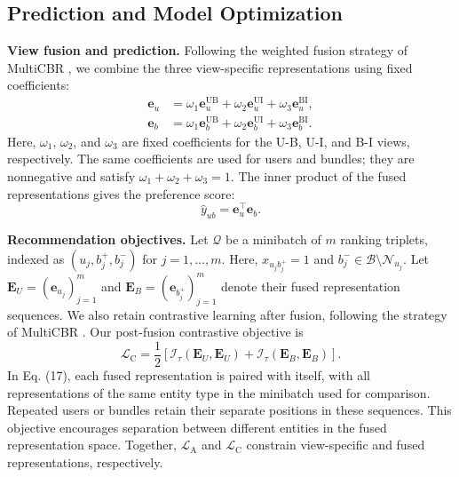 \documentclass[letterpaper]{article}
\begin{document}
\subsection{Prediction and Model Optimization}

\textbf{View fusion and prediction.} Following the weighted fusion strategy of MultiCBR \cite{ma2024multicbr}, we combine the three view-specific representations using fixed coefficients:
\begin{equation}
\begin{aligned}
\mathbf e_u
&=\omega_1\mathbf e_u^{\mathrm{UB}}
+\omega_2\mathbf e_u^{\mathrm{UI}}
+\omega_3\mathbf e_u^{\mathrm{BI}},\\
\mathbf e_b
&=\omega_1\mathbf e_b^{\mathrm{UB}}
+\omega_2\mathbf e_b^{\mathrm{UI}}
+\omega_3\mathbf e_b^{\mathrm{BI}}.
\end{aligned}
\tag{15}
\end{equation}
Here, $\omega_1$, $\omega_2$, and $\omega_3$ are fixed coefficients for the U-B, U-I, and B-I views, respectively. The same coefficients are used for users and bundles; they are nonnegative and satisfy $\omega_1+\omega_2+\omega_3=1$. The inner product of the fused representations gives the preference score:
\begin{equation}
\hat y_{ub}=\mathbf e_u^\top\mathbf e_b.
\tag{16}
\end{equation}

\textbf{Recommendation objectives.} Let $\mathcal Q$ be a minibatch of $m$ ranking triplets, indexed as $(u_j,b_j^+,b_j^-)$ for $j=1,\ldots,m$. Here, $x_{u_jb_j^+}=1$ and $b_j^-\in\mathcal B\setminus\mathcal N_{u_j}$. Let $\mathbf E_U=(\mathbf e_{u_j})_{j=1}^{m}$ and $\mathbf E_B=(\mathbf e_{b_j^+})_{j=1}^{m}$ denote their fused representation sequences. We also retain contrastive learning after fusion, following the strategy of MultiCBR \cite{ma2024multicbr}. Our post-fusion contrastive objective is
\begin{equation}
\mathcal L_{\mathrm C}
=\frac{1}{2}\left[
\mathcal I_\tau(\mathbf E_U,\mathbf E_U)
+\mathcal I_\tau(\mathbf E_B,\mathbf E_B)
\right].
\tag{17}
\end{equation}
In Eq. (17), each fused representation is paired with itself, with all representations of the same entity type in the minibatch used for comparison. Repeated users or bundles retain their separate positions in these sequences. This objective encourages separation between different entities in the fused representation space. Together, $\mathcal L_{\mathrm A}$ and $\mathcal L_{\mathrm C}$ constrain view-specific and fused representations, respectively.
\end{document}
